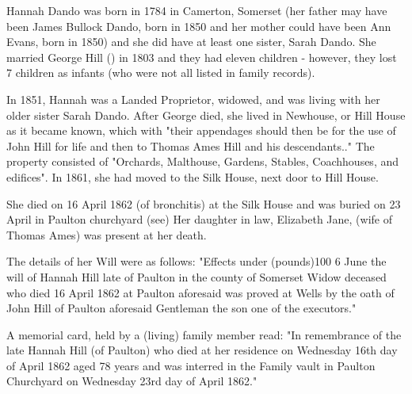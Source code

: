 
   
Hannah Dando was born in 1784 in Camerton, Somerset (her father may have been James Bullock Dando, born in 1850 and her mother could have been Ann Evans, born in 1850) and she did have at least one sister, Sarah Dando.  She married George Hill () in 1803 and they had eleven children - however, they lost 7 children as infants (who were not all listed in family records). 

In 1851, Hannah was a Landed Proprietor, widowed, and was living with her older sister Sarah Dando.\cite{HDandoHome} After George died, she lived in Newhouse, or Hill House as it became known, which with "their appendages should then be for the use of John Hill for life and then to Thomas Ames Hill and his descendants.." The property consisted of "Orchards, Malthouse, Gardens, Stables, Coachhouses, and edifices". In 1861, she had moved to the Silk House, next door to Hill House.\cite{HDando1861}

She died on 16 April 1862 (of bronchitis) at the Silk House and was buried on 23 April in Paulton churchyard (see) Her daughter in law, Elizabeth Jane, (wife of Thomas Ames) was present at her death.  

The details of her Will were as follows: 
"Effects under (pounds)100 6 June the will of Hannah Hill late of Paulton in the county of Somerset Widow deceased who died 16 April 1862 at Paulton aforesaid was proved at Wells by the oath of John Hill of Paulton aforesaid Gentleman the son one of the executors."

A memorial card, held by a (living) family member read:
"In remembrance of the late Hannah Hill (of Paulton) who died at her residence on Wednesday 16th day of April 1862 aged 78 years and was interred in the Family vault in Paulton Churchyard on Wednesday 23rd day of April 1862." 
